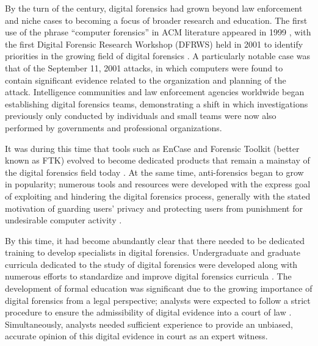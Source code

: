 \documentclass[letterpaper,12pt]{report}
\begin{document}
By the turn of the century, digital forensics had grown beyond law
enforcement and niche cases to becoming a focus of broader research and
education. The first use of the phrase ``computer forensics'' in ACM
literature appeared in 1999
\cite{cooperStandardsDigitalForensics2010}, with the first Digital
Forensic Research Workshop (DFRWS) held in 2001 to identify priorities
in the growing field of digital forensics
\cite{palmerRoadMapDigital2001}. A particularly notable case was
that of the September 11, 2001 attacks, in which computers were found to
contain significant evidence related to the organization and planning of
the attack. Intelligence communities and law enforcement agencies
worldwide began establishing digital forensics teams, demonstrating a
shift in which investigations previously only conducted by individuals
and small teams were now also performed by governments and professional
organizations.

It was during this time that tools such as EnCase and Forensic Toolkit
(better known as FTK) evolved to become dedicated products that remain a
mainstay of the digital forensics field today
\cite{pollittHistoryDigitalForensics2010}. At the same time,
anti-forensics began to grow in popularity; numerous tools and resources
were developed with the express goal of exploiting and hindering the
digital forensics process, generally with the stated motivation of
guarding users' privacy and protecting users from punishment for
undesirable computer activity
\cite{geigerEvaluatingCommercialCounterForensic2005,harrisArrivingAntiforensicsConsensus2006}.

By this time, it had become abundantly clear that there needed to be
dedicated training to develop specialists in digital forensics.
Undergraduate and graduate curricula dedicated to the study of digital
forensics were developed
\cite{andersonComparativeStudyTeaching2006,srinivasanDigitalForensicsCurriculum2013}
along with numerous efforts to standardize and improve digital forensics
curricula
\cite{cooperStandardsDigitalForensics2010,nanceDigitalForensicsDefining2009,nanceDigitalForensicsDefining2010,dafoulasOverviewDigitalForensics2019,lucianoDigitalForensicsNext2018}.
The development of formal education was significant due to the growing
importance of digital forensics from a legal perspective; analysts were
expected to follow a strict procedure to ensure the admissibility of
digital evidence into a court of law
\cite{conklinComputerForensics2022}. Simultaneously, analysts needed
sufficient experience to provide an unbiased, accurate opinion of this
digital evidence in court as an expert witness.
\end{document}
